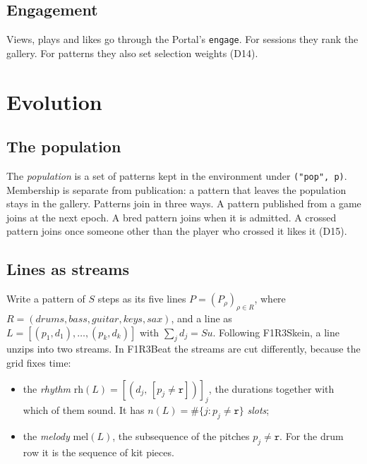 \documentclass[11pt,a4paper]{article}
\newcommand{\code}[1]{\texttt{#1}}
\begin{document}
\subsection{Engagement}

Views, plays and likes go through the Portal's \code{engage}. For sessions they rank the
gallery. For patterns they also set selection weights (D14).

\section{Evolution}\label{sec:evolution}

\subsection{The population}

The \emph{population} is a set of patterns kept in the environment under \code{("pop", p)}.
Membership is separate from publication: a pattern that leaves the population stays in the
gallery. Patterns join in three ways. A pattern published from a game joins at the next
epoch. A bred pattern joins when it is admitted. A crossed pattern joins once someone other
than the player who crossed it likes it (D15).

\subsection{Lines as streams}

Write a pattern of $S$ steps as its five lines $P=(P_\rho)_{\rho\in R}$, where
$R=(\mathit{drums},\mathit{bass},\mathit{guitar},\mathit{keys},\mathit{sax})$, and a line as
$L=[(p_1,d_1),\dots,(p_k,d_k)]$ with $\sum_j d_j=Su$. Following F1R3Skein, a line unzips into
two streams. In F1R3Beat the streams are cut differently, because the grid fixes time:

\begin{itemize}[leftmargin=1.2em,itemsep=2pt]
\item the \emph{rhythm} $\mathrm{rh}(L)=[(d_j,\,[p_j\ne\code{r}])]_j$, the durations together
  with which of them sound. It has $n(L)=\#\{j : p_j\ne\code{r}\}$ \emph{slots};
\item the \emph{melody} $\mathrm{mel}(L)$, the subsequence of the pitches $p_j\ne\code{r}$. For
  the drum row it is the sequence of kit pieces.
\end{itemize}
\end{document}
